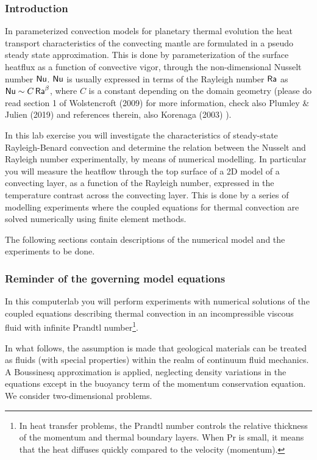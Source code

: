 
\subsubsection{Introduction}

In parameterized convection models for planetary thermal evolution the heat transport characteristics 
of the convecting mantle are formulated in a pseudo steady state approximation. 
This is done by parameterization of the surface heatflux as a function of convective vigor, 
through the non-dimensional Nusselt number ${\mathsf{Nu}}$. 
${\mathsf{Nu}}$ is usually expressed in terms of the 
Rayleigh number ${\mathsf{Ra}}$ as ${\mathsf{Nu}} \sim C\, {\mathsf{Ra}}^\beta$, where $C$ is a 
constant depending on the domain geometry
(please do read section 1 of Wolstencroft \etal (2009) \cite{wodd09} 
for more information, check also Plumley \& Julien (2019) \cite{plju19} and references therein, 
also Korenaga (2003) \cite{kore03}).

In this lab exercise you will investigate the characteristics of steady-state Rayleigh-Benard convection 
and determine the relation between the Nusselt and Rayleigh number experimentally, 
by means of numerical modelling. In particular you will measure the heatflow through the top surface of 
a 2D model of a convecting layer, as a function of the Rayleigh number, expressed in the temperature 
contrast across the convecting layer. 
This is done by a series of modelling experiments where the coupled equations for thermal convection are solved 
numerically using finite element methods.

The following sections contain descriptions of the numerical model and the experiments to be done. 

\subsubsection{Reminder of the governing model equations}

In this computerlab you will perform experiments with numerical solutions of the 
coupled equations describing thermal convection in an 
incompressible viscous fluid with infinite Prandtl number\footnote{In heat transfer problems, 
the Prandtl number controls the relative thickness of 
the momentum and thermal boundary layers. When Pr is small, it means that the heat diffuses 
quickly compared to the velocity (momentum).}.

In what follows, the assumption is made that geological materials can be treated as fluids (with 
special properties) within the realm of continuum fluid mechanics.
A Boussinesq approximation is applied, neglecting density variations in the equations except 
in the buoyancy term of the momentum conservation equation. We consider two-dimensional problems.

